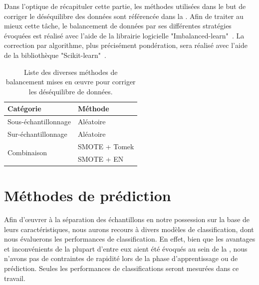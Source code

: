 Dans l'optique de récapituler cette partie, les méthodes utilisées dans le but de corriger le déséquilibre des données sont référencée dans la . Afin de traiter au mieux cette tâche, le balancement de données par ses différentes stratégies évoquées est réalisé avec l'aide de la librairie logicielle "Imbalanced-learn"~\cite{Lemaitre2017}. La correction par algorithme, plus précisément pondération, sera réalisé avec l'aide de la bibliothèque "Scikit-learn"~\cite{pedregosa2011}.\par

\begin{table}[H]
    \centering
    \begin{tabular*}{0.6\linewidth}{l@{\extracolsep{\fill}}l}
        \toprule
        \textbf{Catégorie}                  & \textbf{Méthode}      \\ \hline
        Sous-échantillonnage                 & Aléatoire             \\ \hline
        Sur-échantillonnage                  & Aléatoire             \\ \hline
        \multirow{2}{*}{Combinaison}        & SMOTE + Tomek         \\ \cline{2-2}
                                            & SMOTE + EN            \\
        \bottomrule
    \end{tabular*}
    \caption{Liste des diverses méthodes de balancement mises en œuvre pour corriger les déséquilibre de données.}
    \label{tab:summary_balancement_methods}
\end{table}\par

\section{Méthodes de prédiction}
Afin d'œuvrer à la séparation des échantillons en notre possession sur la base de leurs caractéristiques, nous aurons recours à divers modèles de classification, dont nous évaluerons les performances de classification. En effet, bien que les avantages et inconvénients de la plupart d'entre eux aient été évoqués au sein de la , nous n'avons pas de contraintes de rapidité lors de la phase d'apprentissage ou de prédiction. Seules les performances de classifications seront mesurées dans ce travail.\par

